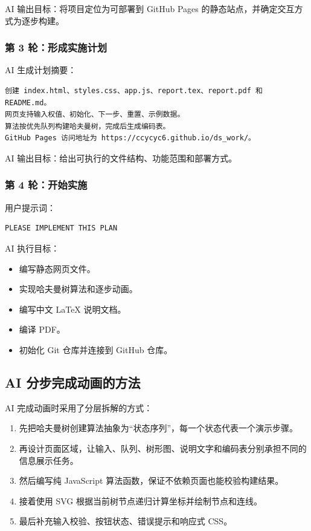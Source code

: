 \documentclass[UTF8,a4paper,12pt]{ctexart}
\begin{document}
AI 输出目标：将项目定位为可部署到 GitHub Pages 的静态站点，并确定交互方式为逐步构建。

\subsubsection*{第 3 轮：形成实施计划}

AI 生成计划摘要：

\begin{lstlisting}
创建 index.html、styles.css、app.js、report.tex、report.pdf 和 README.md。
网页支持输入权值、初始化、下一步、重置、示例数据。
算法按优先队列构建哈夫曼树，完成后生成编码表。
GitHub Pages 访问地址为 https://ccycyc6.github.io/ds_work/。
\end{lstlisting}

AI 输出目标：给出可执行的文件结构、功能范围和部署方式。

\subsubsection*{第 4 轮：开始实施}

用户提示词：

\begin{lstlisting}
PLEASE IMPLEMENT THIS PLAN
\end{lstlisting}

AI 执行目标：

\begin{itemize}
  \item 编写静态网页文件。
  \item 实现哈夫曼树算法和逐步动画。
  \item 编写中文 LaTeX 说明文档。
  \item 编译 PDF。
  \item 初始化 Git 仓库并连接到 GitHub 仓库。
\end{itemize}

\subsection{AI 分步完成动画的方法}

AI 完成动画时采用了分层拆解的方式：

\begin{enumerate}
  \item 先把哈夫曼树创建算法抽象为“状态序列”，每一个状态代表一个演示步骤。
  \item 再设计页面区域，让输入、队列、树形图、说明文字和编码表分别承担不同的信息展示任务。
  \item 然后编写纯 JavaScript 算法函数，保证不依赖页面也能校验构建结果。
  \item 接着使用 SVG 根据当前树节点递归计算坐标并绘制节点和连线。
  \item 最后补充输入校验、按钮状态、错误提示和响应式 CSS。
\end{enumerate}
\end{document}
